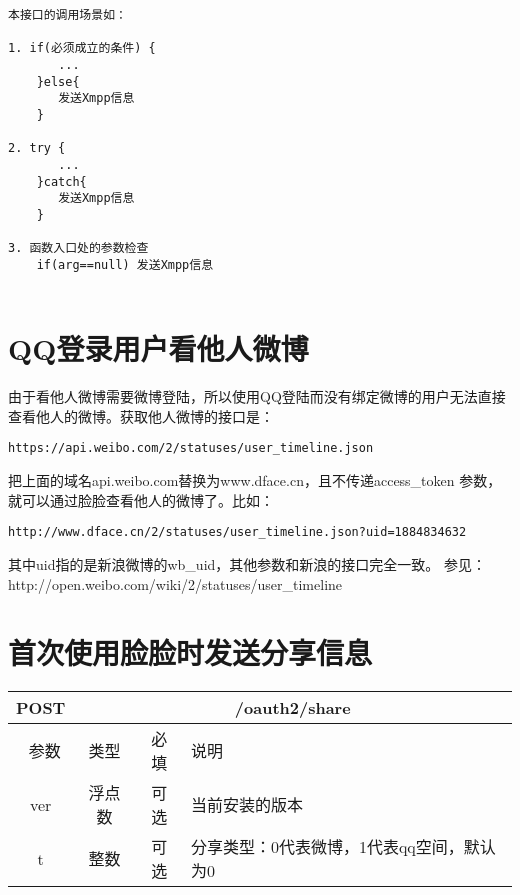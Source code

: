 \documentclass[cs4size]{ctexartutf8}
\begin{document}
\begin{verbatim}
本接口的调用场景如：

1. if(必须成立的条件) {
       ...
    }else{
       发送Xmpp信息
    }

2. try {
       ...
    }catch{
       发送Xmpp信息
    }

3. 函数入口处的参数检查
    if(arg==null) 发送Xmpp信息
    
\end{verbatim}







\section{QQ登录用户看他人微博}
由于看他人微博需要微博登陆，所以使用QQ登陆而没有绑定微博的用户无法直接查看他人的微博。获取他人微博的接口是：
\begin{verbatim}
https://api.weibo.com/2/statuses/user_timeline.json
\end{verbatim}

把上面的域名api.weibo.com替换为www.dface.cn，且不传递access\_token 参数，就可以通过脸脸查看他人的微博了。比如：
\begin{verbatim}
http://www.dface.cn/2/statuses/user_timeline.json?uid=1884834632
\end{verbatim}
其中uid指的是新浪微博的wb\_uid，其他参数和新浪的接口完全一致。
参见：http://open.weibo.com/wiki/2/statuses/user\_timeline



\section{首次使用脸脸时发送分享信息}

\begin{table}[H]
   \begin{center}
\begin{tabular}{|c|c|c|p{12cm}|}
\hline
POST & \multicolumn{3}{|c|}{/oauth2/share} \\
\hline\hline
 \  参数  & 类型 & 必填 &  说明  \\
\hline
   ver  & 浮点数 & 可选 &  当前安装的版本\\
\hline
   t  & 整数 & 可选 &  分享类型：0代表微博，1代表qq空间，默认为0\\
\hline
\end{tabular}
   \end{center}
\end{table}
\end{document}
